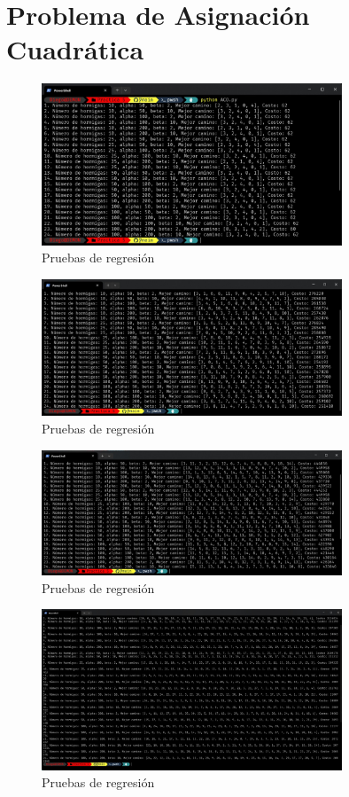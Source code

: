 \documentclass{report}
\begin{document}
\section{Problema de Asignación Cuadrática}

\begin{figure}[H]
    \centering
    \includegraphics[width=0.8\textwidth]{ajuste.dat.jpeg}
    \caption{Pruebas de regresión}
    \label{fig:prueba matriz}
\end{figure}
\begin{figure}[H]
    \centering
    \includegraphics[width=0.8\textwidth]{tai12.dat.jpeg}
    \caption{Pruebas de regresión}
    \label{fig:prueba tai12}
\end{figure}
\begin{figure}[H]
    \centering
    \includegraphics[width=0.8\textwidth]{tai15.dat.jpeg}
    \caption{Pruebas de regresión}
    \label{fig:prueba tai15}
\end{figure}
\begin{figure}[H]
    \centering
    \includegraphics[width=0.8\textwidth]{tai30.dat.jpeg}
    \caption{Pruebas de regresión}
    \label{fig:prueba tai30}
\end{figure}
\end{document}
